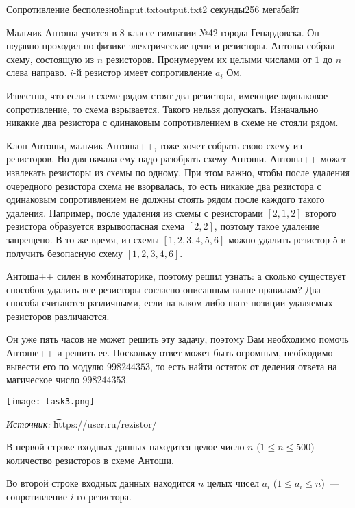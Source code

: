 \begin{problem}{Сопротивление бесполезно!}{input.txt}{output.txt}{2 секунды}{256 мегабайт}

Мальчик Антоша учится в 8 классе гимназии №42 города Гепардовска. Он недавно проходил по физике электрические цепи и резисторы. Антоша собрал схему, состоящую из $n$ резисторов. Пронумеруем их целыми числами от $1$ до $n$ слева направо. $i$-й резистор имеет сопротивление $a_i$ Ом.

Известно, что если в схеме рядом стоят два резистора, имеющие одинаковое сопротивление, то схема взрывается. Такого нельзя допускать. Изначально никакие два резистора с одинаковым сопротивлением в схеме не стояли рядом.

Клон Антоши, мальчик Антоша++, тоже хочет собрать свою схему из резисторов. Но для начала ему надо разобрать схему Антоши. Антоша++ может извлекать резисторы из схемы по одному. При этом важно, чтобы после удаления очередного резистора схема не взорвалась, то есть никакие два резистора с одинаковым сопротивлением не должны стоять рядом после каждого такого удаления. Например, после удаления из схемы с резисторами $[2, 1, 2]$ второго резистора образуется взрывоопасная схема $[2, 2]$, поэтому такое удаление запрещено. В то же время, из схемы $[1, 2, 3, 4, 5, 6]$ можно удалить резистор $5$ и получить безопасную схему $[1, 2, 3, 4, 6]$.

Антоша++ силен в комбинаторике, поэтому решил узнать: а сколько существует способов удалить все резисторы согласно описанным выше правилам? Два способа считаются различными, если на каком-либо шаге позиции удаляемых резисторов различаются.

Он уже пять часов не может решить эту задачу, поэтому Вам необходимо помочь Антоше++ и решить ее. Поскольку ответ может быть огромным, необходимо вывести его по модулю $998244353$, то есть найти остаток от деления ответа на магическое число $998244353$.

\begin{center}
	\texttt{[image: task3.png]}
	
	\scriptsize \textit{Источник:} \t{https://uscr.ru/rezistor/}
\end{center}

\InputFile

В первой строке входных данных находится целое число $n$ ($1 \le n \le 500$)~--- количество резисторов в схеме Антоши.

Во второй строке входных данных находится $n$ целых чисел $a_i$ ($1 \le a_i \le n$)~--- сопротивление $i$-го резистора.


\end{problem}

